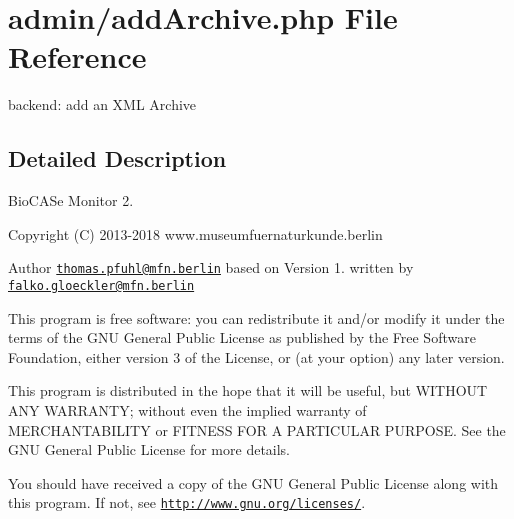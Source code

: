 \hypertarget{add_archive_8php}{}\section{admin/add\+Archive.php File Reference}
\label{add_archive_8php}


backend\+: add an X\+ML Archive  




\subsection{Detailed Description}
Bio\+C\+A\+Se Monitor 2. \begin{DoxyCopyright}{Copyright}
(C) 2013-\/2018 www.\+museumfuernaturkunde.\+berlin 
\end{DoxyCopyright}
\begin{DoxyAuthor}{Author}
\href{mailto:thomas.pfuhl@mfn.berlin}{\tt thomas.\+pfuhl@mfn.\+berlin} based on Version 1. written by \href{mailto:falko.gloeckler@mfn.berlin}{\tt falko.\+gloeckler@mfn.\+berlin}
\end{DoxyAuthor}
This program is free software\+: you can redistribute it and/or modify it under the terms of the G\+NU General Public License as published by the Free Software Foundation, either version 3 of the License, or (at your option) any later version.

This program is distributed in the hope that it will be useful, but W\+I\+T\+H\+O\+UT A\+NY W\+A\+R\+R\+A\+N\+TY; without even the implied warranty of M\+E\+R\+C\+H\+A\+N\+T\+A\+B\+I\+L\+I\+TY or F\+I\+T\+N\+E\+SS F\+OR A P\+A\+R\+T\+I\+C\+U\+L\+AR P\+U\+R\+P\+O\+SE. See the G\+NU General Public License for more details.

You should have received a copy of the G\+NU General Public License along with this program. If not, see \href{http://www.gnu.org/licenses/}{\tt http\+://www.\+gnu.\+org/licenses/}. 